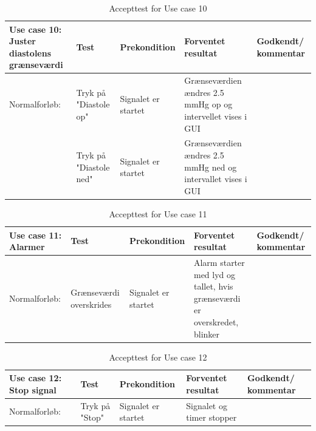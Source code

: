 \begin{table}[H]
\caption{Accepttest for Use case 10}\label{tab:tabel8}
\begin{tabular}{|>{\raggedright\arraybackslash}p{2.5cm}| >{\raggedright\arraybackslash}p{2.9cm} | >{\raggedright\arraybackslash}p{2.9cm} | >{\raggedright\arraybackslash}p{2.9cm} | >{\raggedright\arraybackslash}p{2.8cm} |}
   \hline
   \textbf{Use case 10: Juster diastolens grænseværdi } &\textbf{Test}& \textbf{Prekondition} & \textbf{Forventet resultat} & \textbf{Godkendt/ kommentar}\\ \hline
   Normalforløb:& Tryk på "Diastole op"& Signalet er startet & Grænseværdien ændres 2.5 mmHg op og intervellet vises i GUI &\\\hline
   &Tryk på "Diastole ned" & Signalet er startet & Grænseværdien ændres 2.5 mmHg ned og intervallet vises i GUI & \\\hline
\end{tabular}
\end{table}

\begin{table}[H]
\caption{Accepttest for Use case 11}\label{tab:tabel8}
\begin{tabular}{|>{\raggedright\arraybackslash}p{2.5cm}| >{\raggedright\arraybackslash}p{2.9cm} | >{\raggedright\arraybackslash}p{2.9cm} | >{\raggedright\arraybackslash}p{2.9cm} | >{\raggedright\arraybackslash}p{2.8cm} |}
   \hline
   \textbf{Use case 11: Alarmer } &\textbf{Test}& \textbf{Prekondition} & \textbf{Forventet resultat} & \textbf{Godkendt/ kommentar}\\ \hline
   Normalforløb:& Grænseværdi overskrides& Signalet er startet & Alarm starter med lyd og tallet, hvis grænseværdi er overskredet, blinker &\\\hline
\end{tabular}
\end{table}

\begin{table}[H]
\caption{Accepttest for Use case 12}\label{tab:tabel8}
\begin{tabular}{|>{\raggedright\arraybackslash}p{2.5cm}| >{\raggedright\arraybackslash}p{2.9cm} | >{\raggedright\arraybackslash}p{2.9cm} | >{\raggedright\arraybackslash}p{2.9cm} | >{\raggedright\arraybackslash}p{2.8cm} |}
   \hline
   \textbf{Use case 12: Stop signal } &\textbf{Test}& \textbf{Prekondition} & \textbf{Forventet resultat} & \textbf{Godkendt/ kommentar}\\ \hline
   Normalforløb:& Tryk på "Stop" & Signalet er startet & Signalet og timer stopper &\\\hline
\end{tabular}
\end{table}

